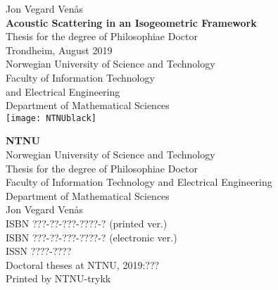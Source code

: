 \thispagestyle{empty}%
\begin{titlepage}
\begin{adjustwidth}{1.7cm}{1.7cm}
    \null%
    \raggedright%
    \LARGE\textcolor{black!60}{Jon Vegard Ven{\aa}s}\\
	\vspace{2cm}%
	\huge%
	\textbf{Acoustic Scattering in an Isogeometric Framework}\\
	\vspace{6.5cm}%
	\large%
	Thesis for the degree of Philosophiae Doctor\\
	\vspace{\baselineskip}%
	Trondheim, August 2019\\
	\vspace{\baselineskip}%
	Norwegian University of Science and Technology\\
	Faculty of Information Technology\\
	and Electrical Engineering\\
	Department of Mathematical Sciences\\
	\vspace*{1.7cm}%
	\texttt{[image: NTNUblack]}
\end{adjustwidth}        
\end{titlepage}
\newpage
\thispagestyle{empty}%
\begin{adjustwidth}{1.2cm}{1.2cm}
	\null\vspace{12cm}%
	\raggedright\footnotesize%
	\textbf{NTNU}\\
	Norwegian University of Science and Technology\\
	\vspace{\baselineskip}%
	Thesis for the degree of Philosophiae Doctor\\
	\vspace{\baselineskip}%
	Faculty of Information Technology and Electrical Engineering\\
	Department of Mathematical Sciences\\
	\vspace{\baselineskip}%
	\textcopyright\xspace Jon Vegard Ven{\aa}s\\
	\vspace{\baselineskip}%
	ISBN ???-??-???-????-? (printed ver.)\\
	ISBN ???-??-???-????-? (electronic ver.)\\
	ISSN ????-????\\
	\vspace{\baselineskip}%
	Doctoral theses at NTNU, 2019:???\\
	\vspace{\baselineskip}%
	Printed by NTNU-trykk
\end{adjustwidth}        